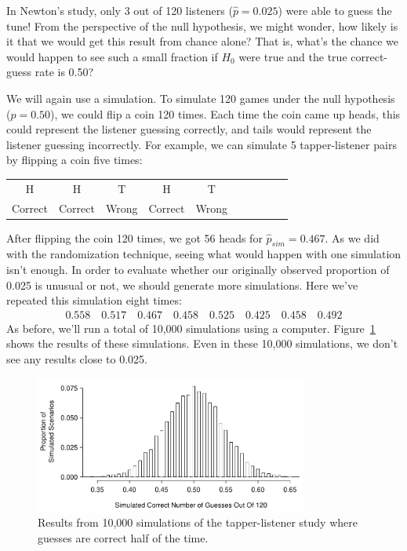 In Newton's study, only 3 out of 120 listeners ($\hat{p} = 0.025$) were able to guess the tune! From the perspective of the null hypothesis, we might wonder, how likely is it that we would get this result from chance alone? That is, what's the chance we would happen to see such a small fraction if $H_0$ were true and the true correct-guess rate is 0.50?

We will again use a simulation. To simulate 120 games under the null hypothesis ($p = 0.50$), we could flip a coin 120 times. Each time the coin came up heads, this could represent the listener guessing correctly, and tails would represent the listener guessing incorrectly. For example, we can simulate 5 tapper-listener pairs by flipping a coin five times:
\begin{center}
\begin{tabular}{ccc ccc ccc c}
H & H & T & H & T \\
Correct & Correct & Wrong & Correct & Wrong \\
\end{tabular}
\end{center}
After flipping the coin 120 times, we got 56 heads for $\hat{p}_{sim} = 0.467$. As we did with the randomization technique, seeing what would happen with one simulation isn't enough. In order to evaluate whether our originally observed proportion of 0.025 is unusual or not, we should generate more simulations. Here we've repeated this simulation eight times:
\begin{align*}
0.558 \quad 0.517 \quad 0.467 \quad 0.458 \quad
0.525 \quad 0.425 \quad 0.458 \quad 0.492
\end{align*} %
As before, we'll run a total of 10,000 simulations using a computer. Figure~\ref{TappersAndListenersNullDistribution} shows the results of these simulations. Even in these 10,000 simulations, we don't see any results close to 0.025.

\begin{figure}[ht]
\centering
\includegraphics[width=0.8\textwidth]{02/figures/TappersAndListeners/TappersAndListenersNullDistribution}
\caption{Results from 10,000 simulations of the tapper-listener study where guesses are correct half of the time.}
\label{TappersAndListenersNullDistribution}
\end{figure}

